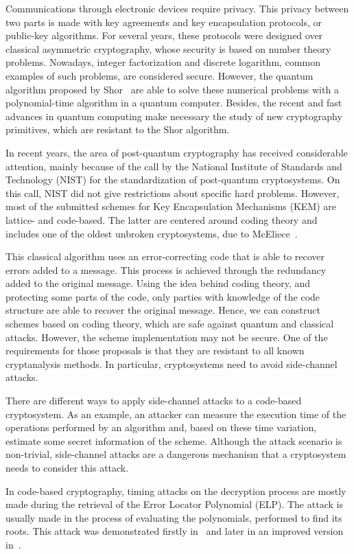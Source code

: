 Communications through electronic devices require privacy. This privacy between two parts is made with key agreements and key encapsulation protocols, or public-key algorithms. For several years, these protocols were designed over classical asymmetric cryptography, whose security is based on number theory problems. Nowadays, integer factorization and discrete logarithm, common examples of such problems, are considered secure. However, the quantum algorithm proposed by Shor~\cite{shor1999polynomial} are able to solve these numerical problems with a polynomial-time algorithm in a quantum computer. Besides, the recent and fast advances in quantum computing make necessary the study of new cryptography primitives, which are resistant to the Shor algorithm. 

In recent years, the area of post-quantum cryptography has received considerable attention, mainly because of the call by the National Institute of Standards and Technology (NIST) for the standardization of post-quantum cryptosystems. On this call, NIST did not give restrictions about specific hard problems. However, most of the submitted schemes for Key Encapsulation Mechanisms (KEM) are lattice- and code-based. The latter are centered around coding theory and includes one of the oldest unbroken cryptosystems, due to McEliece~\cite{mceliece1978public}.

This classical algorithm uses an error-correcting code that is able to recover errors added to a message. This process is achieved through the redundancy added to the original message. Using the idea behind coding theory, and protecting some parts of the code, only parties with knowledge of the code structure are able to recover the original message. Hence, we can construct schemes based on coding theory, which are safe against quantum and classical attacks. However, the scheme implementation may not be secure. One of the requirements for those proposals is that they are resistant to all known cryptanalysis methods. In particular, cryptosystems need to avoid side-channel attacks.

There are different ways to apply side-channel attacks to a code-based cryptosystem. As an example, an attacker can measure the execution time of the operations performed by an algorithm and, based on these time variation, estimate some secret information of the scheme. Although the attack scenario is non-trivial, side-channel attacks are a dangerous mechanism that a cryptosystem needs to consider this attack.
 
In code-based cryptography, timing attacks on the decryption process are mostly made during the retrieval of the Error Locator Polynomial (ELP). The attack is usually made in the process of evaluating the polynomials, performed to find its roots. This attack was demonstrated firstly in~\cite{shoufan2009timing} and later in an improved version in~\cite{bucerzan2017improved}.

